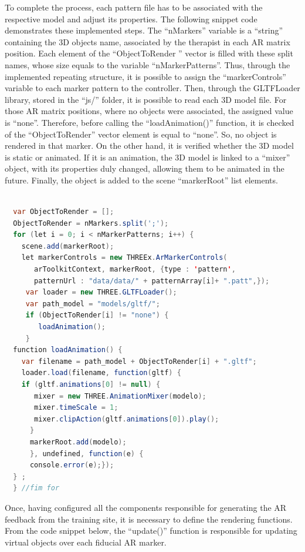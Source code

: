 To complete the process, each pattern file has to be associated with the respective model and adjust its properties. The following snippet code demonstrates these implemented steps. The ``nMarkers'' variable is a ``string'' containing the 3D objects name, associated by the therapist in each AR matrix position.  Each element of the ``ObjectToRender '' vector is filled with these split names, whose size equals to the variable ``nMarkerPatterns''. Thus, through the implemented repeating structure, it is possible to assign the ``markerControls'' variable to each marker pattern to the controller. Then, through the GLTFLoader library, stored in the ``js/'' folder, it is possible to read each 3D model file. For those AR matrix positions, where no objects were associated, the assigned value is ``none''. Therefore, before calling the ``loadAnimation()'' function, it is checked of the ``ObjectToRender'' vector element is equal to ``none''. So, no object is rendered in that marker. On the other hand, it is verified whether the 3D model is static or animated. If it is an animation, the 3D model is linked to a ``mixer'' object, with its properties duly changed, allowing them to be animated in the future. Finally, the object is added to the scene ``markerRoot'' list elements. \newline

\begin{lstlisting}[frame=single,language=Java]  % Start your code-block

  var ObjectToRender = [];
  ObjectToRender = nMarkers.split(';');
  for (let i = 0; i < nMarkerPatterns; i++) {
    scene.add(markerRoot);
    let markerControls = new THREEx.ArMarkerControls(
       arToolkitContext, markerRoot, {type : 'pattern',
       patternUrl : "data/data/" + patternArray[i]+ ".patt",});
     var loader = new THREE.GLTFLoader();
     var path_model = "models/gltf/";
     if (ObjectToRender[i] != "none") { 
        loadAnimation();
     }
  function loadAnimation() {
    var filename = path_model + ObjectToRender[i] + ".gltf";
    loader.load(filename, function(gltf) { 
    if (gltf.animations[0] != null) {
       mixer = new THREE.AnimationMixer(modelo);
       mixer.timeScale = 1;
       mixer.clipAction(gltf.animations[0]).play();
      }
      markerRoot.add(modelo);
      }, undefined, function(e) {
      console.error(e);}); 
  } ;
  } //fim for
\end{lstlisting}

Once, having configured all the components responsible for generating the AR feedback from the training site, it is necessary to define the rendering functions. From the code snippet below, the ``update()'' function is responsible for updating virtual objects over each fiducial AR marker. \newline 

